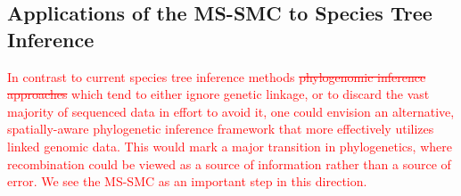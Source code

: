 \documentclass[11pt]{article}
\begin{document}


\subsection{Applications of the MS-SMC to Species Tree Inference}

\textcolor{red}{
In contrast to current species tree inference methods 
\sout{phylogenomic inference approaches}
which tend to either ignore genetic linkage, or to discard the vast majority
of sequenced data in effort to avoid it, one could envision an alternative, 
spatially-aware phylogenetic inference framework that more effectively 
utilizes linked genomic data. This would mark a major transition in phylogenetics,
where recombination could be viewed as a source of information rather than a 
source of error. 
We see the MS-SMC as an important step in this direction. 
}
\end{document}
